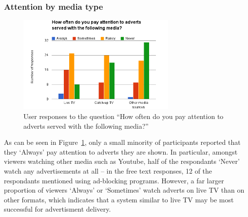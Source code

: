 \subsubsection{Attention by media type}
\label{sec:prestudy_media}
\begin{figure}[H]
	\centering
	\vspace{-10pt}
	\includegraphics[width=0.7\textwidth, clip=true, trim=0 0 0 55pt]{images/prestudy_media.png}
	\caption{User responses to the question ``How often do you pay attention to adverts served with the following media?''}
	\label{fig:prestudy_media}
	\vspace{-15pt}
\end{figure}
As can be seen in Figure~\ref{fig:prestudy_media}, only a small minority of participants reported that they `Always' pay attention to adverts they are shown. In particular, amongst viewers watching other media such as Youtube, half of the respondants `Never' watch any advertisements at all -- in the free text responses, 12 of the respondants mentioned using ad-blocking programs. However, a far larger proportion of viewers `Always' or `Sometimes' watch adverts on live TV than on other formats, which indicates that a system similar to live TV may be most successful for advertisment delivery.

